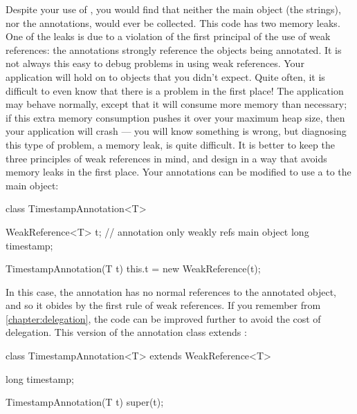 Despite your use of , you would find that neither the main
object (the strings), nor the annotations, would ever be collected. This code
has two memory leaks. One of the leaks is due to a
violation of the first principal of the use of weak references: the annotations
strongly reference the objects being annotated. It is not always this easy to
debug problems in using weak references. Your application will hold on to objects
that you didn't expect. Quite often, it is difficult to even know that there is a
problem in the first place! The application may behave normally, except that it
will consume more memory than necessary; if this extra memory consumption pushes
it over your maximum heap size, then your application will crash --- you will
know something is wrong, but diagnosing this type of problem, a memory
leak, is quite difficult. It is better to keep the
three principles of weak references in mind, and design in a way that avoids
memory leaks in the first place. Your annotations can be modified to use a
 to the main object:

\begin{shortlisting}
class TimestampAnnotation<T> {
	WeakReference<T> t; // annotation only weakly refs main object
	long timestamp;
	
	TimestampAnnotation(T t) {
		this.t = new WeakReference(t);
	}
}
\end{shortlisting}

In this case, the annotation has no normal references to the annotated object,
and so it obides by the first rule of weak references. If you remember from
\autoref{chapter:delegation}, the code can be improved further to avoid the cost
of delegation. This version of the annotation class extends
:

\begin{shortlisting}
class TimestampAnnotation<T> extends WeakReference<T> {
	long timestamp;
	
	TimestampAnnotation(T t) {
		super(t);
	}
}
\end{shortlisting}

